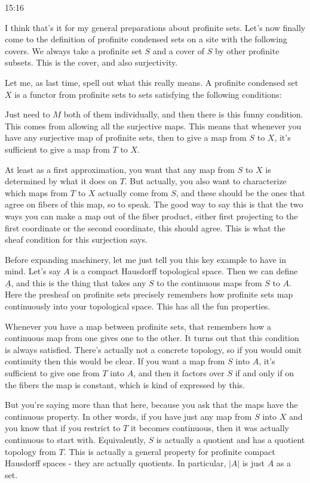 \begin{unfinished}{15:16}
\begin{example}
\begin{remark}
I think that's it for my general preparations about profinite sets. Let's now finally come to the definition of profinite condensed sets on a site with the following covers. We always take a profinite set $S$ and a cover of $S$ by other profinite subsets. This is the cover, and also surjectivity.

Let me, as last time, spell out what this really means. A profinite condensed set $X$ is a functor from profinite sets to sets satisfying the following conditions:

Just need to $M$ both of them individually, and then there is this funny condition. This comes from allowing all the surjective maps. This means that whenever you have any surjective map of profinite sets, then to give a map from $S$ to $X$, it's sufficient to give a map from $T$ to $X$. 

At least as a first approximation, you want that any map from $S$ to $X$ is determined by what it does on $T$. But actually, you also want to characterize which maps from $T$ to $X$ actually come from $S$, and these should be the ones that agree on fibers of this map, so to speak. The good way to say this is that the two ways you can make a map out of the fiber product, either first projecting to the first coordinate or the second coordinate, this should agree. This is what the sheaf condition for this surjection says.

Before expanding machinery, let me just tell you this key example to have in mind. Let's say $A$ is a compact Hausdorff topological space. Then we can define $\underline{A}$, and this is the thing that takes any $S$ to the continuous maps from $S$ to $A$. Here the presheaf on profinite sets precisely remembers how profinite sets map continuously into your topological space. This has all the fun properties.

Whenever you have a map between profinite sets, that remembers how a continuous map from one gives one to the other. It turns out that this condition is always satisfied. There's actually not a concrete topology, so if you would omit continuity then this would be clear. If you want a map from $S$ into $A$, it's sufficient to give one from $T$ into $A$, and then it factors over $S$ if and only if on the fibers the map is constant, which is kind of expressed by this.

But you're saying more than that here, because you ask that the maps have the continuous property. In other words, if you have just any map from $S$ into $X$ and you know that if you restrict to $T$ it becomes continuous, then it was actually continuous to start with. Equivalently, $S$ is actually a quotient and has a quotient topology from $T$. This is actually a general property for profinite compact Hausdorff spaces - they are actually quotients. In particular, $|A|$ is just $A$ as a set.


\end{remark}
\end{example}
\end{unfinished}
